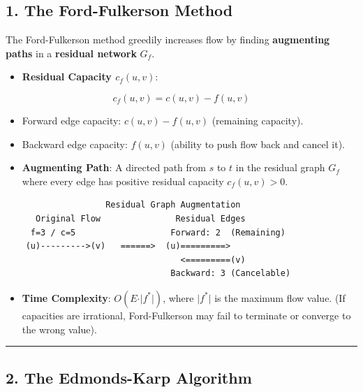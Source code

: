 \documentclass[
]{book}
\providecommand{\tightlist}{%
  \setlength{\itemsep}{0pt}\setlength{\parskip}{0pt}}
\theoremstyle{definition}
\theoremstyle{definition}
\theoremstyle{definition}
\theoremstyle{definition}
\theoremstyle{remark}
\begin{document}
\subsection{1. The Ford-Fulkerson Method}\label{the-ford-fulkerson-method}

The Ford-Fulkerson method greedily increases flow by finding \textbf{augmenting paths} in a \textbf{residual network} \(G_f\).

\begin{itemize}
\tightlist
\item
  \textbf{Residual Capacity \(c_f(u, v)\)}:
\end{itemize}

\[c_f(u, v) = c(u, v) - f(u, v)\]

\begin{itemize}
\item
  Forward edge capacity: \(c(u, v) - f(u, v)\) (remaining capacity).
\item
  Backward edge capacity: \(f(u, v)\) (ability to push flow back and cancel it).
\item
  \textbf{Augmenting Path}: A directed path from \(s\) to \(t\) in the residual graph \(G_f\) where every edge has positive residual capacity \(c_f(u, v) > 0\).
\end{itemize}

\begin{verbatim}
                    Residual Graph Augmentation
      Original Flow               Residual Edges
     f=3 / c=5                   Forward: 2  (Remaining)
    (u)--------->(v)   ======>  (u)=========>
                                   <=========(v)
                                 Backward: 3 (Cancelable)
\end{verbatim}

\begin{itemize}
\tightlist
\item
  \textbf{Time Complexity}: \(O(E \cdot \vert{}f^*\vert{})\), where \(\vert{}f^*\vert{}\) is the maximum flow value. (If capacities are irrational, Ford-Fulkerson may fail to terminate or converge to the wrong value).
\end{itemize}

\begin{center}\rule{0.5\linewidth}{0.5pt}\end{center}

\subsection{2. The Edmonds-Karp Algorithm}\label{the-edmonds-karp-algorithm}
\end{document}
